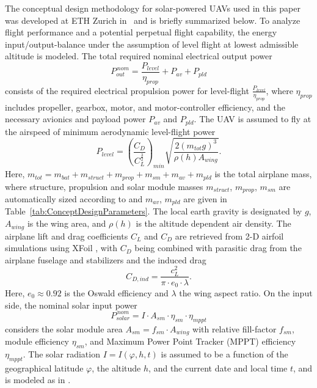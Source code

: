 The conceptual design methodology for solar-powered UAVs used in this paper was developed at ETH Zurich in~\cite{Noth_PhD,Leutenegger_JIRS} and is briefly summarized below. To analyze flight performance and a potential perpetual flight capability, the energy input/output-balance under the assumption of level flight at lowest admissible altitude is modeled. The total required nominal electrical output power
\begin{equation} \label{eqn:P_out}
P_{out}^{\,nom}=\frac{P_{level}}{\eta_{prop}}+P_{av}+P_{pld}
\end{equation}
consists of the required electrical propulsion power for level-flight $\frac{P_{level}}{\eta_{prop}}$, where $\eta_{prop}$ includes propeller, gearbox, motor, and motor-controller efficiency, and the necessary avionics and payload power $P_{av}$ and $P_{pld}$. The UAV is assumed to fly at the airspeed of minimum aerodynamic level-flight power
\begin{equation} \label{eqn:P_level}
P_{level}=\left(\frac{C_D}{C_L^\frac{3}{2}}\right)_{min}\sqrt{\frac{2(m_{tot}g)^3}{\rho(h)A_{wing}}} .
\end{equation}
Here, $m_{tot}=m_{bat}+m_{struct}+m_{prop}+m_{sm}+m_{av}+m_{pld}$ is the total airplane mass, where structure, propulsion and solar module masses $m_{struct}$, $m_{prop}$, $m_{sm}$ are automatically sized according to \cite{Noth_PhD,Leutenegger_JIRS} and $m_{av}$, $m_{pld}$ are given in Table~\ref{tab:ConceptDesignParameters}. The local earth gravity is designated by $g$, $A_{wing}$ is the wing area, and $\rho(h)$ is the altitude dependent air density. The airplane lift and drag coefficients $C_L$ and $C_D$ are retrieved from 2-D airfoil simulations using XFoil \cite{Drela_XFoil}, with $C_D$ being combined with parasitic drag from the airplane fuselage and stabilizers and the induced drag  
\begin{equation} \label{eqn:C_D}
C_{D,ind}=\frac{c_L^2}{\pi\cdot e_0\cdot\lambda} .
\end{equation}
Here, $e_0\approx0.92$ is the Oswald efficiency and $\lambda$ the wing aspect ratio. On the input side, the nominal solar input power
\begin{equation} \label{eqn:P_solar}
P_{solar}^{\,nom}=I\cdot A_{sm}\cdot\eta_{sm}\cdot\eta_{mppt}
\end{equation}
considers the solar module area $A_{sm}=f_{sm}\cdot A_{wing}$ with relative fill-factor $f_{sm}$, module efficiency $\eta_{sm}$, and Maximum Power Point Tracker (MPPT) efficiency $\eta_{mppt}$. The solar radiation $I=I(\varphi,h,t)$ is assumed to be a function of the geographical latitude $\varphi$, the altitude $h$, and the current date and local time $t$, and is modeled as in \cite{Duffie_SolarEngineering}.
